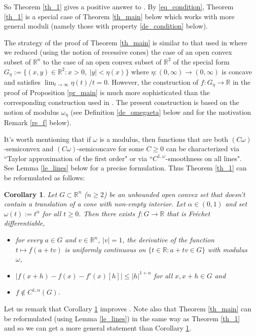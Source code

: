 \documentclass[10pt,a4paper]{amsart}
\newtheorem{corollary}[theorem]{Corollary}
\theoremstyle{definition}
\newcommand{\R}{\mathbb{R}}
\begin{document}
So Theorem \ref{th_1} gives a positive answer to \cite[Question 6.10 (3), (4)]{KZ}. By \eqref{eq_condition}, Theorem \ref{th_1} is a special case of Theorem \ref{th_main} below which works with more general moduli (namely those with property \eqref{de_condition} below).

The strategy of the proof of Theorem \ref{th_main} is similar to that used in \cite{KZ} where we reduced (using the notion of recessive cones) the case of an open convex subset of $ \R^n $ to the case of an open convex subset of $ \R^2 $ of the special form $ G_{\eta}:=\lbrace(x,y)\in\R^2:x>0,\;\vert y\vert<\eta(x)\rbrace $ where $ \eta:(0,\infty)\to(0,\infty) $ is concave and satisfies $ \lim_{t\to\infty}\eta(t)/t=0 $. However, the construction of $ f:G_{\eta}\to\R $ in the proof of Proposition \ref{pr_main} is much more sophisticated than the corresponding construction used in \cite{KZ}. The present construction is based on the notion of modulus $ \omega_{\eta} $ (see Definition \ref{de_omegaeta} below and for the motivation Remark \ref{re_f} below).
 

It's worth mentioning that if $ \omega $ is a modulus, then functions that are both $ (C\omega) $-semiconvex and $ (C\omega) $-semiconcave for some $ C\geq 0 $ can be characterized via ``Taylor approximation of the first order" or via ``$ C^{1,\omega} $-smoothness on all lines". See Lemma \ref{le_lines} below for a precise formulation. Thus Theorem \ref{th_1} can be reformulated as follows:

\begin{corollary}\label{co_1}
Let $ G\subset\R^n $ ($ n\geq 2 $) be an unbounded open convex set that doesn't contain a translation of a cone with non-empty interior. Let $ \alpha\in (0,1) $ and set $ \omega(t):=t^\alpha $ for all $ t\geq 0 $. Then there exists $ f:G\to\R $ that is Fréchet differentiable,
\begin{itemize}
\item[(i)] for every $ a\in G $ and $ v\in\R^n $, $ \vert v\vert=1 $, the derivative of the function $ t\mapsto f(a+tv) $ is uniformly continuous on $ \lbrace t\in\R:a+tv\in G\rbrace $ with modulus $ \omega $,
\item[(ii)] $ \vert f(x+h)-f(x)-f'(x)[h]\vert\leq\vert h\vert^{1+\alpha} $ for all $ x,x+h\in G $ and
\item[(iii)] $ f\notin C^{1,\alpha}(G) $.
\end{itemize}
\end{corollary}

Let us remark that Corollary \ref{co_1} improves \cite[Theorem 6.8]{KZ}. Note also that Theorem \ref{th_main} can be reformulated (using Lemma \ref{le_lines}) in the same way as Theorem \ref{th_1} and so we can get a more general statement than Corollary \ref{co_1}.
\end{document}

